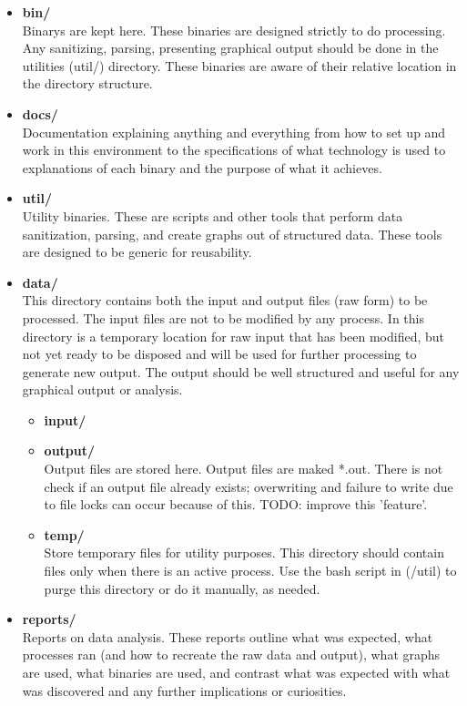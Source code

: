 \documentclass{article}
\begin{document}
\begin{itemize}
	\item \textbf{bin/}\\
	Binarys are kept here. These binaries are designed strictly to do processing. Any sanitizing, parsing, presenting graphical output should be done in the utilities (util/) directory. These binaries are aware of their relative location in the directory structure. 
 
	\item \textbf{docs/}\\
	Documentation explaining anything and everything from how to set up and work in this environment to the specifications of what technology is used to explanations of each binary and the purpose of what it achieves.  
 
	\item \textbf{util/}\\
	Utility binaries. These are scripts and other tools that perform data sanitization, parsing, and create graphs out of structured data. These tools are designed to be generic for reusability. 
 
	\item \textbf{data/}\\
	This directory contains both the input and output files (raw form) to be processed. The input files are not to be modified by any process. In this directory is a temporary location for raw input that has been modified, but not yet ready to be disposed and will be used for further processing to generate new output. The output should be well structured and useful for any graphical output or analysis. 
 
 
	\begin{itemize}
		
		\item \textbf{input/}\\
 
		\item \textbf{output/}\\
		Output files are stored here. Output files are maked *.out. There is not check if an output file already exists; overwriting and failure to write due to file locks can occur because of this. TODO: improve this 'feature'.
 
		\item \textbf{temp/}\\
		Store temporary files for utility purposes. This directory should contain files only when there is an active process. Use the bash script in (/util) to purge this directory or do it manually, as needed. 
	
	\end{itemize} 
	
	
	\item \textbf{reports/}\\
	Reports on data analysis. These reports outline what was expected, what processes ran (and how to recreate the raw data and output), what graphs are used, what binaries are used, and contrast what was expected with what was discovered and any further implications or curiosities.
  
\end{itemize} 
\end{document}
